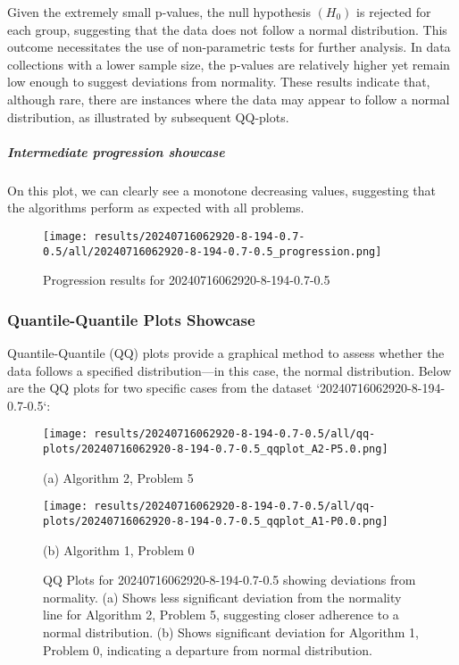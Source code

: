 \documentclass[12pt,a4paper]{article}
\begin{document}
Given the extremely small p-values, the null hypothesis $(H_0)$ is rejected for each group, suggesting that the data does not follow a normal distribution. This outcome necessitates the use of non-parametric tests for further analysis. In data collections with a lower sample size, the p-values are relatively higher yet remain low enough to suggest deviations from normality. These results indicate that, although rare, there are instances where the data may appear to follow a normal distribution, as illustrated by subsequent QQ-plots.

\subparagraph{Intermediate progression showcase}
On this plot, we can clearly see a monotone decreasing values, suggesting that the algorithms perform as expected with all problems. \\
\begin{figure}[h]
    \centering
    \texttt{[image: results/20240716062920-8-194-0.7-0.5/all/20240716062920-8-194-0.7-0.5\_progression.png]}
    \caption{Progression results for 20240716062920-8-194-0.7-0.5}
    \label{fig:Progression}    
\end{figure}

\subsubsection{Quantile-Quantile Plots Showcase}
Quantile-Quantile (QQ) plots provide a graphical method to assess whether the data follows a specified distribution—in this case, the normal distribution. Below are the QQ plots for two specific cases from the dataset `20240716062920-8-194-0.7-0.5`:

\begin{figure}[htbp]
\centering
\begin{minipage}{.5\textwidth}
  \centering
  \texttt{[image: results/20240716062920-8-194-0.7-0.5/all/qq-plots/20240716062920-8-194-0.7-0.5\_qqplot\_A2-P5.0.png]}
  \caption{(a) Algorithm 2, Problem 5}
\end{minipage}%
\begin{minipage}{.5\textwidth}
  \centering
  \texttt{[image: results/20240716062920-8-194-0.7-0.5/all/qq-plots/20240716062920-8-194-0.7-0.5\_qqplot\_A1-P0.0.png]}
  \caption{(b) Algorithm 1, Problem 0}
\end{minipage}
\caption{QQ Plots for 20240716062920-8-194-0.7-0.5 showing deviations from normality. (a) Shows less significant deviation from the normality line for Algorithm 2, Problem 5, suggesting closer adherence to a normal distribution. (b) Shows significant deviation for Algorithm 1, Problem 0, indicating a departure from normal distribution.}
\label{fig:qq_plots}
\end{figure}
\end{document}
